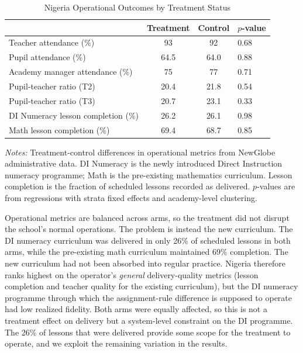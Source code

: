 \documentclass[11pt]{article}
\begin{document}
\begin{table}[H]
\centering
\caption{Nigeria Operational Outcomes by Treatment Status}
\label{tab:ng_operational}
\begin{threeparttable}
\begin{tabular}[t]{lccl}
\toprule
 & Treatment & Control & $p$-value \\
\midrule
Teacher attendance (\%) & 93 & 92 & 0.68 \\
Pupil attendance (\%) & 64.5 & 64.0 & 0.88 \\
Academy manager attendance (\%) & 75 & 77 & 0.71 \\
Pupil-teacher ratio (T2) & 20.4 & 21.8 & 0.54 \\
Pupil-teacher ratio (T3) & 20.7 & 23.1 & 0.33 \\
DI Numeracy lesson completion (\%) & 26.2 & 26.1 & 0.98 \\
Math lesson completion (\%) & 69.4 & 68.7 & 0.85 \\
\bottomrule
\end{tabular}
\begin{tablenotes}
\footnotesize
\item \textit{Notes:} Treatment-control differences in operational metrics from NewGlobe administrative data. DI Numeracy is the newly introduced Direct Instruction numeracy programme; Math is the pre-existing mathematics curriculum. Lesson completion is the fraction of scheduled lessons recorded as delivered. $p$-values are from regressions with strata fixed effects and academy-level clustering.
\end{tablenotes}
\end{threeparttable}
\end{table}

Operational metrics are balanced across arms, so the treatment did not disrupt the school's normal operations. The problem is instead the new curriculum. The DI numeracy curriculum was delivered in only 26\% of scheduled lessons in both arms, while the pre-existing math curriculum maintained 69\% completion. The new curriculum had not been absorbed into regular practice. Nigeria therefore ranks highest on the operator's \emph{general} delivery-quality metrics (lesson completion and teacher quality for the existing curriculum), but the DI numeracy programme through which the assignment-rule difference is supposed to operate had low realized fidelity. Both arms were equally affected, so this is not a treatment effect on delivery but a system-level constraint on the DI programme. The 26\% of lessons that were delivered provide some scope for the treatment to operate, and we exploit the remaining variation in the results.
\end{document}
